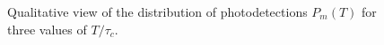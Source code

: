 \begin{figure}
\centering



\caption{Qualitative view of the distribution of photodetections
  $P_m\left(T\right)$ for three values of $T/\tau_c$.}
\label{figPart4Ch2_6}
\end{figure}